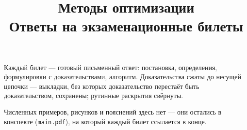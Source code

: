\documentclass[12pt,a4paper]{article}
\title{\textbf{Методы оптимизации}\\[0.3em]\large Ответы на экзаменационные билеты}
\author{}
\date{}
\begin{document}
\maketitle
\thispagestyle{empty}

\begin{idea}[title={Как этим пользоваться}]
Каждый билет — готовый письменный ответ: постановка, определения, формулировки
с доказательствами, алгоритм. Доказательства сжаты до несущей цепочки —
выкладки, без которых доказательство перестаёт быть доказательством,
сохранены; рутинные раскрытия свёрнуты.

\medskip
Численных примеров, рисунков и пояснений здесь нет — они остались в конспекте
(\texttt{main.pdf}), на который каждый билет ссылается в конце.
\end{idea}

\tableofcontents
\newpage




















\end{document}
